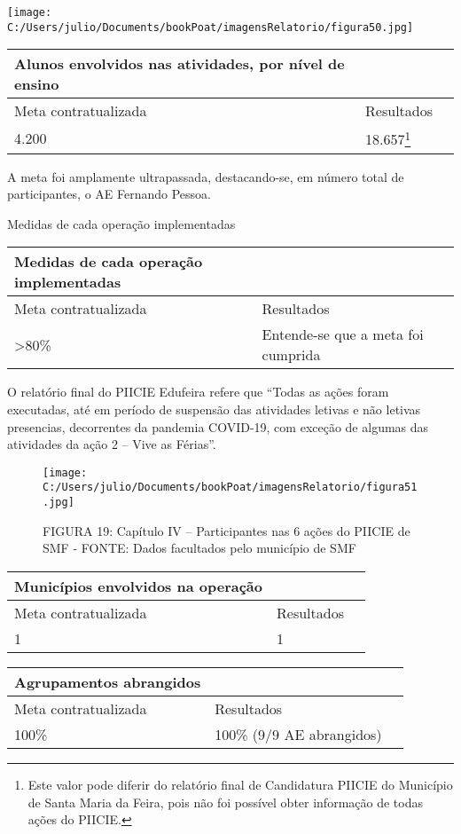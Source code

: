 \documentclass[
]{book}
\begin{document}
\texttt{[image: C:/Users/julio/Documents/bookPoat/imagensRelatorio/figura50.jpg]}

\begin{longtable}[]{@{}lll@{}}
\toprule()
Alunos envolvidos nas atividades, por nível de ensino & & \\
\midrule()
\endhead
Meta contratualizada & Resultados & \\
4.200 & 18.657\footnote{Este valor pode diferir do relatório final de Candidatura PIICIE do Município de Santa Maria da Feira, pois não foi possível obter informação de todas ações do PIICIE.} & \\
\bottomrule()
\end{longtable}

A meta foi amplamente ultrapassada, destacando-se, em número total de participantes, o AE Fernando Pessoa.

Medidas de cada operação implementadas

\begin{longtable}[]{@{}lll@{}}
\toprule()
Medidas de cada operação implementadas & & \\
\midrule()
\endhead
Meta contratualizada & Resultados & \\
\textgreater80\% & Entende-se que a meta foi cumprida & \\
\bottomrule()
\end{longtable}

O relatório final do PIICIE Edufeira refere que ``Todas as ações foram executadas, até em período de suspensão das atividades letivas e não letivas presencias, decorrentes da pandemia COVID-19, com exceção de algumas das atividades da ação 2 -- Vive as Férias''.

\begin{figure}
\centering
\texttt{[image: C:/Users/julio/Documents/bookPoat/imagensRelatorio/figura51.jpg]}
\caption{FIGURA 19: Capítulo IV -- Participantes nas 6 ações do PIICIE de SMF - FONTE: Dados facultados pelo município de SMF}
\end{figure}

\begin{longtable}[]{@{}lll@{}}
\toprule()
Municípios envolvidos na operação & & \\
\midrule()
\endhead
Meta contratualizada & Resultados & \\
1 & 1 & \\
\bottomrule()
\end{longtable}

\begin{longtable}[]{@{}lll@{}}
\toprule()
Agrupamentos abrangidos & & \\
\midrule()
\endhead
Meta contratualizada & Resultados & \\
100\% & 100\% (9/9 AE abrangidos) & \\
\bottomrule()
\end{longtable}
\end{document}
